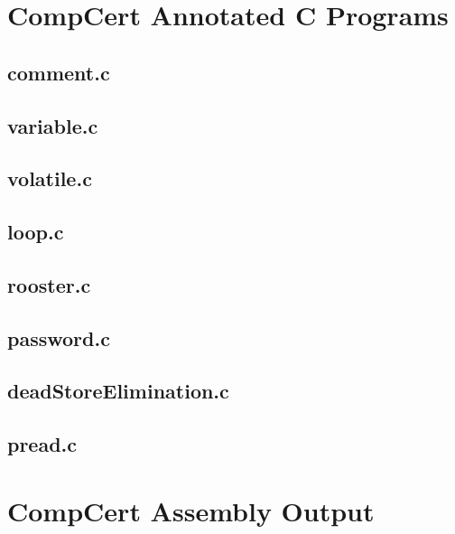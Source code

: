 \begin{appendices}
\chapter{CompCert Annotated C Programs}
\label{app:compCertC}
\section{comment.c}


\section{variable.c}


\section{volatile.c}


\section{loop.c}


\section{rooster.c}


\section{password.c}


\section{deadStoreElimination.c}


\section{pread.c}


\chapter{CompCert Assembly Output}
\label{app:compCertAssembly}
\lstset{language=[x64]Assembler}

\end{appendices}
